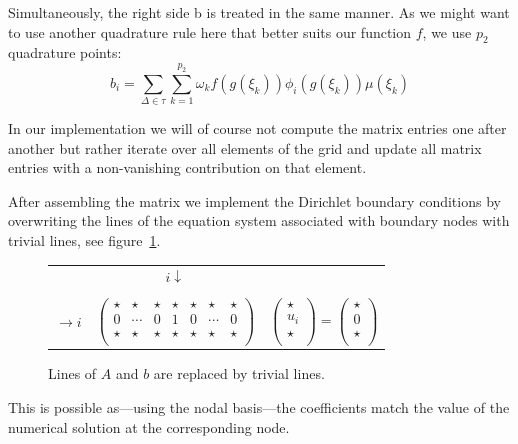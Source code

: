 \documentclass[11pt,a4paper,headinclude,footinclude,DIV16,headings=normal]{scrreprt}
\begin{document}
Simultaneously, the right side b is treated in the same manner. As we might want to use another quadrature rule here that better suits our function $f$, we use $p_2$ quadrature points:
\begin{equation}
\label{equ:computeb}
 b_i = \sum\limits_{\Delta\in\tau}\sum\limits_{k=1}^{p_2}\omega_k f(g(\xi_k ))\phi_i (g(\xi_k ))\mu(\xi_k )
\end{equation}

In our implementation we will of course not compute the matrix entries one after another but rather iterate over all elements of the grid and update all matrix entries with a non-vanishing contribution on that element.

After assembling the matrix we implement the Dirichlet boundary conditions by overwriting the lines of the equation system associated with boundary nodes with trivial lines, see figure~\ref{Fig:dirichlet}.

\begin{figure}
\centering
\begin{tabular}{ccl}
& $\begin{array}{cccccccc}
& & &i\downarrow& & &\\
\end{array}$ & \\
$\rightarrow{i}$ &
$\left(\begin{array}{ccccccc}
\star&\star&\star&\star&\star&\star&\star\\
0&\cdots&0&1&0&\cdots&0\\
\star&\star&\star&\star&\star&\star&\star\\
\end{array}\right)$ &
$\left(\begin{array}{c}
\star \\
u_i \\
\star \\
\end{array}\right)
=
\left(\begin{array}{c}
\star \\
0 \\
\star \\
\end{array}\right)$
\end{tabular}
\caption{Lines of $A$ and $b$ are replaced by trivial lines.}
\label{Fig:dirichlet}
\end{figure}

This is possible as---using the nodal basis---the coefficients match the value of the numerical solution at the corresponding node.
\end{document}
